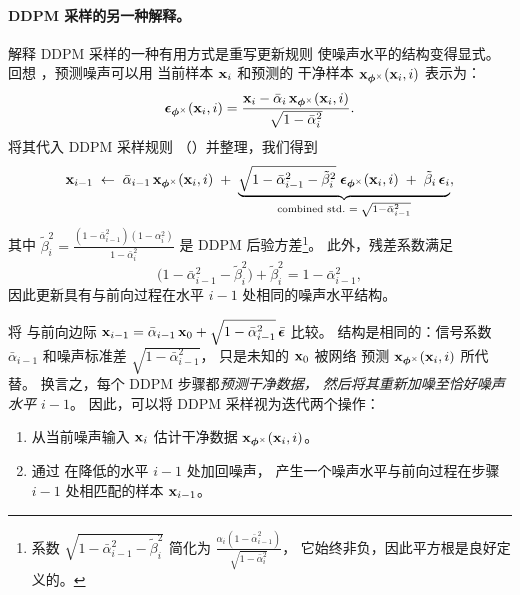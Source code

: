 \paragraph{DDPM 采样的另一种解释。}

解释 DDPM 采样的一种有用方式是重写更新规则
使噪声水平的结构变得显式。
回想 ，预测噪声可以用
当前样本 ${\mathbf{x}}_i$ 和预测的
干净样本 ${\mathbf{x}}_{\bm{\phi}^\times}({\mathbf{x}}_i,i)$ 表示为：
\[
\boldsymbol{\epsilon}_{\bm{\phi}^\times}({\mathbf{x}}_i,i)
=
\frac{{\mathbf{x}}_i - \bar{\alpha}_i\,{\mathbf{x}}_{\bm{\phi}^\times}({\mathbf{x}}_i,i)}
     {\sqrt{1-\bar{\alpha}_i^2}}.
\]
将其代入 DDPM 采样规则
（）并整理，我们得到
\begin{equation}\label{eq:ddpm-renoise}
{\mathbf{x}}_{i-1}
\;\leftarrow\;
\bar{\alpha}_{i-1}\,{\mathbf{x}}_{\bm{\phi}^\times}({\mathbf{x}}_i,i)
\;+\;
\underbrace{
  \sqrt{1-\bar{\alpha}_{i-1}^2 - \tilde{\beta}_i^2}\;
  \boldsymbol{\epsilon}_{\bm{\phi}^\times}({\mathbf{x}}_i,i)
  \;+\;
  \tilde{\beta}_i\,\boldsymbol{\epsilon}_i
}_{\text{combined std.\ }=\;\sqrt{1-\bar{\alpha}_{i-1}^2}},
\end{equation}
其中 $\tilde{\beta}_i^2
= \frac{(1-\bar{\alpha}_{i-1}^2)(1-\alpha_i^2)}{1-\bar{\alpha}_i^2}$
是 DDPM 后验方差\footnote{%
系数
$\sqrt{1-\bar{\alpha}_{i-1}^2 - \tilde{\beta}_i^2}$
简化为
$\frac{\alpha_i(1-\bar{\alpha}_{i-1}^2)}{\sqrt{1-\bar{\alpha}_i^2}}$，
它始终非负，因此平方根是良好定义的。}。
此外，残差系数满足
\[
\bigl(1-\bar{\alpha}_{i-1}^2-\tilde{\beta}_i^2\bigr)+\tilde{\beta}_i^2
=
1-\bar{\alpha}_{i-1}^2,
\]
因此更新具有与前向过程在水平 $i-1$ 处相同的噪声水平结构。

将  与前向边际
${\mathbf{x}}_{i-1} = \bar{\alpha}_{i-1}\,{\mathbf{x}}_0
+ \sqrt{1-\bar{\alpha}_{i-1}^2}\,\bar{\boldsymbol{\epsilon}}$ 比较。
结构是相同的：信号系数 $\bar{\alpha}_{i-1}$
和噪声标准差 $\sqrt{1-\bar{\alpha}_{i-1}^2}$，
只是未知的 ${\mathbf{x}}_0$ 被网络
预测 ${\mathbf{x}}_{\bm{\phi}^\times}({\mathbf{x}}_i,i)$ 所代替。
换言之，每个 DDPM 步骤都\emph{预测干净数据，
然后将其重新加噪至恰好噪声水平 $i{-}1$}。
因此，可以将 DDPM 采样视为迭代两个操作：
\begin{enumerate}
    \item {}
          从当前噪声输入 ${\mathbf{x}}_i$ 估计干净数据
          ${\mathbf{x}}_{\bm{\phi}^\times}({\mathbf{x}}_i, i)$。
    \item {}
          通过  在降低的水平 $i{-}1$
          处加回噪声，
          产生一个噪声水平与前向过程在步骤 $i{-}1$ 处相匹配的样本 ${\mathbf{x}}_{i-1}$。
\end{enumerate}


